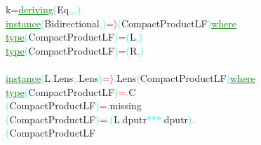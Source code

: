 {\rm{}k}\hsspace \textcolor{red}{=}\hsspace \textcolor{green}{\underline{deriving}}\hsspace \textcolor{cyan}{(}{\rm{}Eq}\textcolor{cyan}{,}\textcolor{cyan}{,}\textcolor{cyan}{,}\textcolor{cyan}{)}\\\textcolor{green}{\underline{instance}}\hsspace \textcolor{cyan}{(}{\rm{}Bidirectional}\textcolor{cyan}{,}\textcolor{cyan}{)}\hsspace \textcolor{red}{=\ensuremath{\rangle}}\hsspace \textcolor{cyan}{(}{\rm{}CompactProductLF}\textcolor{cyan}{)}\hsspace \textcolor{green}{\underline{where}}\\\hstab \textcolor{green}{\underline{type}}\hsspace \textcolor{cyan}{(}{\rm{}CompactProductLF}\textcolor{cyan}{)}\hsspace \textcolor{red}{=}\hsspace \textcolor{cyan}{(}{\rm{}L}\textcolor{cyan}{,}\textcolor{cyan}{)}\\\hstab \textcolor{green}{\underline{type}}\hsspace \textcolor{cyan}{(}{\rm{}CompactProductLF}\textcolor{cyan}{)}\hsspace \textcolor{red}{=}\hsspace \textcolor{cyan}{(}{\rm{}R}\textcolor{cyan}{,}\textcolor{cyan}{)}\\\\\textcolor{green}{\underline{instance}}\hsspace \textcolor{cyan}{(}{\rm{}L}\textcolor{cyan}{.}{\rm{}Lens}\textcolor{cyan}{,}\textcolor{cyan}{.}{\rm{}Lens}\textcolor{cyan}{)}\hsspace \textcolor{red}{=\ensuremath{\rangle}}\textcolor{cyan}{.}{\rm{}Lens}\hsspace \textcolor{cyan}{(}{\rm{}CompactProductLF}\textcolor{cyan}{)}\hsspace \textcolor{green}{\underline{where}}\\\hstab \textcolor{green}{\underline{type}}\hsspace \hsspace \textcolor{cyan}{(}{\rm{}CompactProductLF}\textcolor{cyan}{)}\hsspace \textcolor{red}{=}\textcolor{cyan}{.}{\rm{}C}\\\hsspace \textcolor{cyan}{(}{\rm{}CompactProductLF}\textcolor{cyan}{)}\hsspace \textcolor{red}{=}\textcolor{cyan}{.}{\rm{}missing}\\\hsspace \hsspace \hsspace \textcolor{cyan}{(}{\rm{}CompactProductLF}\textcolor{cyan}{)}\hsspace \textcolor{red}{=}\hsspace \textcolor{cyan}{.}\hsspace \textcolor{cyan}{(}{\rm{}L}\textcolor{cyan}{.}{\rm{}dputr}\hsspace \textcolor{cyan}{***}\textcolor{cyan}{.}{\rm{}dputr}\textcolor{cyan}{)}\hsspace \textcolor{cyan}{.}\\\hsspace \hsspace \hsspace \textcolor{cyan}{(}{\rm{}CompactProductLF}\hsspace 